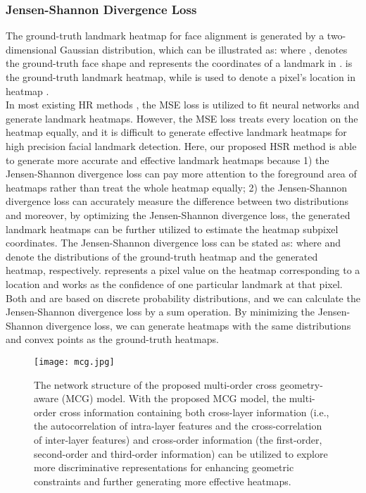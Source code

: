 \documentclass[journal]{IEEEtran}
\begin{document}
\subsubsection{Jensen-Shannon Divergence Loss}
\indent\indent The ground-truth landmark heatmap for face alignment is generated by a two-dimensional Gaussian distribution, which can be illustrated as:
where ,  denotes the ground-truth face shape and  represents the coordinates of a landmark in .  is the ground-truth landmark heatmap, while  is used to denote a pixel's location in heatmap .
\\\indent In most existing HR methods \cite{Yang2017StackedHN, Dong2018StyleAN}, the MSE loss is utilized to fit neural networks and generate landmark heatmaps. However, the MSE loss treats every location on the heatmap equally, and it is difficult to generate effective landmark heatmaps for high precision facial landmark detection. Here, our proposed HSR method is able to generate more accurate and effective landmark heatmaps because 1) the Jensen-Shannon divergence loss can pay more attention to the foreground area of heatmaps rather than treat the whole heatmap equally; 2) the Jensen-Shannon divergence loss can accurately measure the difference between two distributions and moreover, by optimizing the Jensen-Shannon divergence loss, the generated landmark heatmaps can be further utilized to estimate the heatmap subpixel coordinates. The Jensen-Shannon divergence loss can be stated as:
where  and  denote the distributions of the ground-truth heatmap and the generated heatmap, respectively.  represents a pixel value on the heatmap  corresponding to a location  and works as the confidence of one particular landmark at that pixel. Both  and  are based on discrete probability distributions, and we can calculate the Jensen-Shannon divergence loss by a sum operation. By minimizing the Jensen-Shannon divergence loss, we can generate heatmaps with the same distributions and convex points as the ground-truth heatmaps.
\begin{figure*}
	\begin{center}
\texttt{[image: mcg.jpg]}
	\end{center}
	\caption{The network structure of the proposed multi-order cross geometry-aware (MCG) model. With the proposed MCG model, the multi-order cross information containing both cross-layer information (i.e., the autocorrelation of intra-layer features and the cross-correlation of inter-layer features) and cross-order information (the first-order, second-order and third-order information) can be utilized to explore more discriminative representations for enhancing geometric constraints and further generating more effective heatmaps.}
	\label{figmcg}
\end{figure*}
\end{document}
